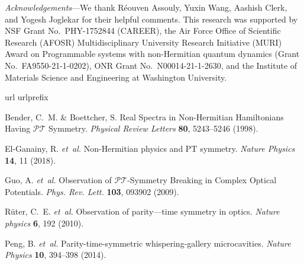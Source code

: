\documentclass[prl,twocolumn,english,superscriptaddress,floatfix,longbibliography]{revtex4-2}
\begin{document}
\emph{Acknowledgements}---We thank R\'eouven Assouly, Yuxin Wang, Aashish Clerk, and Yogesh Joglekar for their helpful comments.  This research was supported by NSF Grant No.~PHY-1752844 (CAREER), the Air Force Office of Scientific Research (AFOSR) Multidisciplinary University Research Initiative (MURI) Award on Programmable systems with non-Hermitian quantum dynamics (Grant No.~FA9550-21-1-0202), ONR Grant No.~N00014-21-1-2630, and the Institute of Materials Science and Engineering at Washington University.



%
%

\begin{thebibliography}{10}
\expandafter\ifx\csname url\endcsname\relax
  \def\url#1{\texttt{#1}}\fi
\expandafter\ifx\csname urlprefix\endcsname\relax\def\urlprefix{URL }\fi
\providecommand{\bibinfo}[2]{#2}
\providecommand{\eprint}[2][]{\url{#2}}

\bibinfo{author}{Bender, C.~M.} \& \bibinfo{author}{Boettcher, S.}
\newblock Real Spectra in Non-Hermitian Hamiltonians Having $\mathcal{PT}$
  Symmetry.
\newblock \emph{\bibinfo{journal}{Physical Review Letters}}
  \textbf{\bibinfo{volume}{80}}, \bibinfo{pages}{5243--5246}
  (\bibinfo{year}{1998}).

\bibinfo{author}{El-Ganainy, R.} \emph{et~al.}
\newblock Non-Hermitian physics and PT symmetry.
\newblock \emph{\bibinfo{journal}{Nature Physics}}
  \textbf{\bibinfo{volume}{14}}, \bibinfo{pages}{11} (\bibinfo{year}{2018}).

\bibinfo{author}{Guo, A.} \emph{et~al.}
\newblock Observation of $\mathcal{P}\mathcal{T}$-Symmetry Breaking in Complex
  Optical Potentials.
\newblock \emph{\bibinfo{journal}{Phys. Rev. Lett.}}
  \textbf{\bibinfo{volume}{103}}, \bibinfo{pages}{093902}
  (\bibinfo{year}{2009}).

\bibinfo{author}{R{\"u}ter, C.~E.} \emph{et~al.}
\newblock Observation of parity---time symmetry in optics.
\newblock \emph{\bibinfo{journal}{Nature physics}}
  \textbf{\bibinfo{volume}{6}}, \bibinfo{pages}{192} (\bibinfo{year}{2010}).

\bibinfo{author}{Peng, B.} \emph{et~al.}
\newblock Parity-time-symmetric whispering-gallery microcavities.
\newblock \emph{\bibinfo{journal}{Nature Physics}}
  \textbf{\bibinfo{volume}{10}}, \bibinfo{pages}{394--398}
  (\bibinfo{year}{2014}).


\end{thebibliography}
\end{document}
